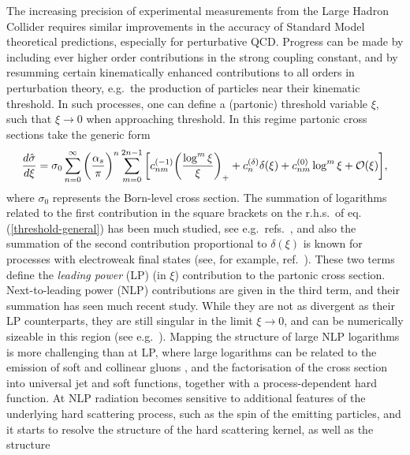 \documentclass[11pt]{article}
\newcommand{\be}{\begin{equation}}
\newcommand{\ee}{\end{equation}}
\newcommand{\ord}{{\cal O}}
\newcommand\eqn[1]     {eq.\,(\ref{#1})}
\begin{document}
The increasing precision of experimental 
measurements from the Large Hadron Collider 
requires similar improvements in the accuracy 
of Standard Model theoretical predictions, 
especially for perturbative QCD. Progress 
can be made by including ever higher 
order contributions in the strong coupling 
constant, and by resumming certain kinematically 
enhanced contributions to all orders in perturbation 
theory, e.g.\ the production of particles near 
their kinematic threshold. In such processes, 
one can define a (partonic) threshold variable 
$\xi$, such that $\xi \to 0$ when approaching 
threshold. In this regime partonic cross sections 
take the generic form
\be\label{threshold-general}
\frac{d\hat \sigma}{d\xi} = \sigma_0 \sum_{n = 0}^{\infty}
\bigg(\frac{\alpha_s}{\pi} \bigg)^n \sum_{m = 0}^{2n-1}
\bigg[ c_{nm}^{(-1)} \bigg( \frac{\log^m \xi}{\xi}\bigg)_+
+ c_{n}^{(\delta)} \delta(\xi) + c_{nm}^{(0)} \log^m \xi
+\ord(\xi) \bigg],
\ee
where $\sigma_0$ represents the Born-level 
cross section. The summation of logarithms 
related to the first contribution in the 
square brackets on the r.h.s.\ of 
\eqn{threshold-general} has been much 
studied, see e.g.\ refs.~\cite{Altarelli:1979ub,Parisi:1980xd,Curci:1979am,Sterman:1987aj,Catani:1989ne,Catani:1990rp,Korchemsky:1993xv,Korchemsky:1993uz,Forte:2002ni,Contopanagos:1997nh,Becher:2006nr,Schwartz:2007ib,Bauer:2008dt,Chiu:2009mg}, 
and also the summation of the second 
contribution proportional to $\delta(\xi)$
is known for processes with electroweak 
final states (see, for example, ref.~\cite{Eynck:2003fn,Ahrens:2009cxz}). 
These two terms define the \emph{leading power} 
(LP) (in $\xi$) contribution to the partonic 
cross section. Next-to-leading power (NLP) 
contributions are given in the third term, 
and their summation has seen much recent 
study. While they are not as divergent as 
their LP counterparts, they are still 
singular in the limit $\xi\to 0$, and 
can be numerically sizeable in this 
region (see e.g.\ \cite{vanBeekveld:2021hhv}). 
Mapping the structure of large NLP logarithms 
is more challenging than at LP, where large 
logarithms can be related to the emission 
of soft and collinear gluons \cite{DelDuca:1990gz,Bonocore:2014wua,Bonocore:2015esa},
and the factorisation of the cross section 
into universal jet and soft functions, together 
with a process-dependent hard function. At NLP 
radiation becomes sensitive to additional features 
of the underlying hard scattering process, such
as the spin of the emitting particles, and it 
starts to resolve the structure of the hard 
scattering kernel, as well as the structure 
\end{document}
